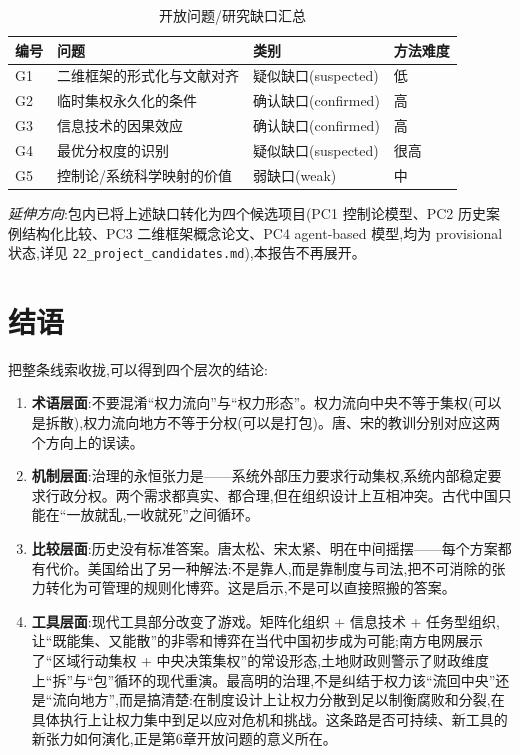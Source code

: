 \documentclass[UTF8,12pt,a4paper]{ctexrep}
\begin{document}
\begin{table}[htbp]
  \centering
  \small
  \caption{开放问题/研究缺口汇总}
  \label{tab:gaps}
  \begin{tabularx}{\linewidth}{@{}lXll@{}}
    \toprule
    \textbf{编号} & \textbf{问题} & \textbf{类别} & \textbf{方法难度} \\
    \midrule
    G1 & 二维框架的形式化与文献对齐 & 疑似缺口(suspected) & 低 \\
    G2 & 临时集权永久化的条件 & 确认缺口(confirmed) & 高 \\
    G3 & 信息技术的因果效应 & 确认缺口(confirmed) & 高 \\
    G4 & 最优分权度的识别 & 疑似缺口(suspected) & 很高 \\
    G5 & 控制论/系统科学映射的价值 & 弱缺口(weak) & 中 \\
    \bottomrule
  \end{tabularx}
\end{table}

\emph{延伸方向}:包内已将上述缺口转化为四个候选项目(PC1 控制论模型、PC2 历史案例结构化比较、PC3 二维框架概念论文、PC4 agent-based 模型,均为 provisional 状态,详见 \texttt{22\_project\_candidates.md}),本报告不再展开。

\chapter*{结语}

把整条线索收拢,可以得到四个层次的结论:

\begin{enumerate}
  \item \textbf{术语层面}:不要混淆``权力流向''与``权力形态''。权力流向中央不等于集权(可以是拆散),权力流向地方不等于分权(可以是打包)。唐、宋的教训分别对应这两个方向上的误读。
  \item \textbf{机制层面}:治理的永恒张力是——系统外部压力要求行动集权,系统内部稳定要求行政分权。两个需求都真实、都合理,但在组织设计上互相冲突。古代中国只能在``一放就乱,一收就死''之间循环。
  \item \textbf{比较层面}:历史没有标准答案。唐太松、宋太紧、明在中间摇摆——每个方案都有代价。美国给出了另一种解法:不是靠人,而是靠制度与司法,把不可消除的张力转化为可管理的规则化博弈。这是启示,不是可以直接照搬的答案。
  \item \textbf{工具层面}:现代工具部分改变了游戏。矩阵化组织 + 信息技术 + 任务型组织,让``既能集、又能散''的非零和博弈在当代中国初步成为可能;南方电网展示了``区域行动集权 + 中央决策集权''的常设形态,土地财政则警示了财政维度上``拆''与``包''循环的现代重演。最高明的治理,不是纠结于权力该``流回中央''还是``流向地方'',而是搞清楚:在制度设计上让权力分散到足以制衡腐败和分裂,在具体执行上让权力集中到足以应对危机和挑战。这条路是否可持续、新工具的新张力如何演化,正是第6章开放问题的意义所在。
\end{enumerate}
\end{document}
